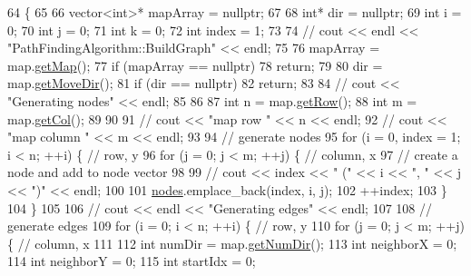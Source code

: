 \begin{DoxyCode}
64                                           \{
65 
66     vector<int>* mapArray = \textcolor{keyword}{nullptr};
67 
68     \textcolor{keywordtype}{int}* dir = \textcolor{keyword}{nullptr};
69     \textcolor{keywordtype}{int} i = 0;
70     \textcolor{keywordtype}{int} j = 0;
71     \textcolor{keywordtype}{int} k = 0;
72     \textcolor{keywordtype}{int} index = 1;
73     
74     \textcolor{comment}{// cout << endl << "PathFindingAlgorithm::BuildGraph" << endl;}
75     
76     mapArray = map.\hyperlink{classMap_ad5c4312f11909eafc091715686b6ceda}{getMap}();
77     \textcolor{keywordflow}{if} (mapArray == \textcolor{keyword}{nullptr})
78         \textcolor{keywordflow}{return};
79 
80     dir = map.\hyperlink{classMap_a4f9142718a50c64152465aacc1033f26}{getMoveDir}();
81     \textcolor{keywordflow}{if} (dir == \textcolor{keyword}{nullptr})
82         \textcolor{keywordflow}{return};
83 
84     \textcolor{comment}{// cout << "Generating nodes" << endl;}
85 
86 
87     \textcolor{keywordtype}{int} n = map.\hyperlink{classMap_a80e0ea134ccb9a22092ce4c520063cd2}{getRow}();
88     \textcolor{keywordtype}{int} m = map.\hyperlink{classMap_a88d24c08a4669040d7de6bd5f6272862}{getCol}();
89 
90 
91     \textcolor{comment}{// cout << "map row " << n << endl;}
92     \textcolor{comment}{// cout << "map column " << m << endl;}
93 
94     \textcolor{comment}{// generate nodes}
95     \textcolor{keywordflow}{for} (i = 0, index = 1; i < n; ++i) \{ \textcolor{comment}{// row, y}
96         \textcolor{keywordflow}{for} (j = 0; j < m; ++j) \{ \textcolor{comment}{// column, x}
97             \textcolor{comment}{// create a node and add to node vector}
98 
99             \textcolor{comment}{// cout << index << " (" << i << ", " << j << ")" << endl;}
100         
101             \hyperlink{classPathFindingAlgorithm_a3405321350d5fb10ba367c47944a7b77}{nodes}.emplace\_back(index, i, j);
102             ++index;
103         \}
104     \}
105 
106     \textcolor{comment}{// cout << endl << "Generating edges" << endl;}
107 
108     \textcolor{comment}{// generate edges}
109     \textcolor{keywordflow}{for} (i = 0; i < n; ++i) \{ \textcolor{comment}{// row, y}
110         \textcolor{keywordflow}{for} (j = 0; j < m; ++j) \{ \textcolor{comment}{// column, x}
111 
112             \textcolor{keywordtype}{int} numDir = map.\hyperlink{classMap_a04501949c81ac8dd6a7aeaca908fe969}{getNumDir}();
113             \textcolor{keywordtype}{int} neighborX = 0;
114             \textcolor{keywordtype}{int} neighborY = 0;
115             \textcolor{keywordtype}{int} startIdx = 0;

\end{DoxyCode}
